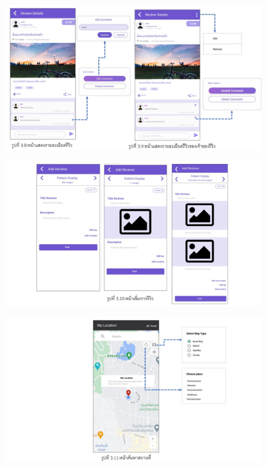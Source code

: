  \begin{figure}
  \begin{center}
    \includegraphics[width=1\textwidth]{./image/reviews/Slide3.JPG}
  \end{center}
  \end{figure}
  
 \begin{figure}
  \begin{center}
    \includegraphics[width=1\textwidth]{./image/reviews/Slide4.JPG}
  \end{center}
  \end{figure}

 \begin{figure}
  \begin{center}
    \includegraphics[width=1\textwidth]{./image/reviews/Slide5.JPG}
  \end{center}
  \end{figure}


